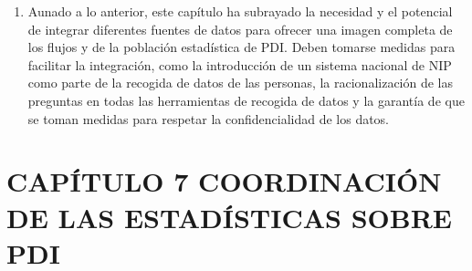 \documentclass[
]{book}
\begin{document}
\begin{enumerate}
\item
  Aunado a lo anterior, este capítulo ha subrayado la necesidad y el potencial de integrar diferentes fuentes de datos para ofrecer una imagen completa de los flujos y de la población estadística de PDI. Deben tomarse medidas para facilitar la integración, como la introducción de un sistema nacional de NIP como parte de la recogida de datos de las personas, la racionalización de las preguntas en todas las herramientas de recogida de datos y la garantía de que se toman medidas para respetar la confidencialidad de los datos.
\end{enumerate}

\hypertarget{capuxedtulo-7-coordinaciuxf3n-de-las-estaduxedsticas-sobre-pdi}{%
\chapter{CAPÍTULO 7 COORDINACIÓN DE LAS ESTADÍSTICAS SOBRE PDI}\label{capuxedtulo-7-coordinaciuxf3n-de-las-estaduxedsticas-sobre-pdi}}
\end{document}
